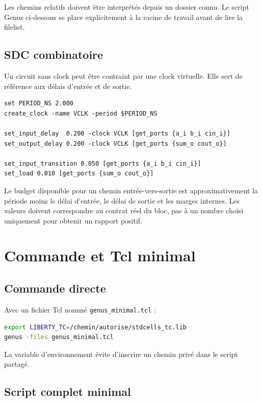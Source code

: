 \documentclass[11pt,a4paper,openany]{report}
\begin{document}
Les chemins relatifs doivent être interprétés depuis un dossier connu. Le
script Genus ci-dessous se place explicitement à la racine de travail avant de
lire la filelist.

\section{SDC combinatoire}

Un circuit sans clock peut être contraint par une clock virtuelle. Elle sert
de référence aux délais d'entrée et de sortie.

\begin{lstlisting}[style=guidecode,language=TclGuide,
caption={syn/constraints.sdc}]
set PERIOD_NS 2.000
create_clock -name VCLK -period $PERIOD_NS

set_input_delay  0.200 -clock VCLK [get_ports {a_i b_i cin_i}]
set_output_delay 0.200 -clock VCLK [get_ports {sum_o cout_o}]

set_input_transition 0.050 [get_ports {a_i b_i cin_i}]
set_load 0.010 [get_ports {sum_o cout_o}]
\end{lstlisting}

\begin{keybox}[Interprétation]
Le budget disponible pour un chemin entrée-vers-sortie est approximativement
la période moins le délai d'entrée, le délai de sortie et les marges internes.
Les valeurs doivent correspondre au contrat réel du bloc, pas à un nombre
choisi uniquement pour obtenir un rapport positif.
\end{keybox}

\chapter{Commande et Tcl minimal}

\section{Commande directe}

Avec un fichier Tcl nommé \texttt{genus\_minimal.tcl} :

\begin{lstlisting}[style=guidecode,language=bash]
export LIBERTY_TC=/chemin/autorise/stdcells_tc.lib
genus -files genus_minimal.tcl
\end{lstlisting}

La variable d'environnement évite d'inscrire un chemin privé dans le script
partagé.

\section{Script complet minimal}
\end{document}
